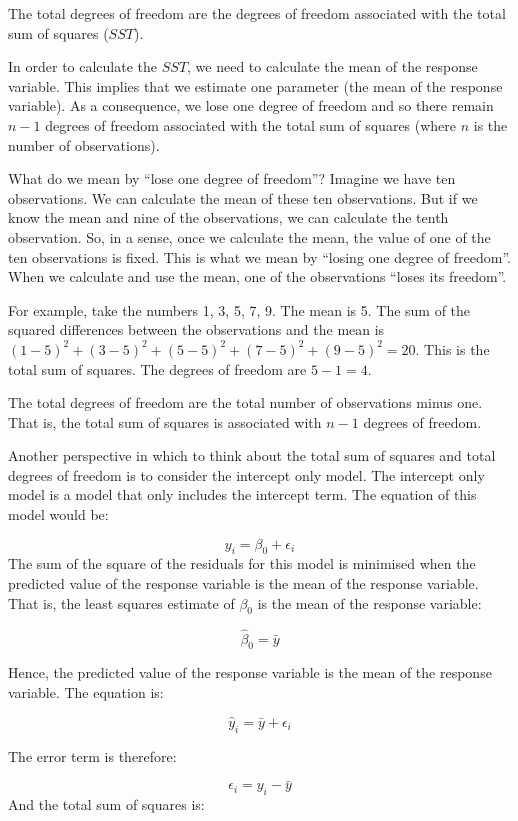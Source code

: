 \documentclass[
  letterpaper,
  8pt,
  a4paper]{book}
\begin{document}
The total degrees of freedom are the degrees of freedom associated with
the total sum of squares (\(SST\)).

In order to calculate the \(SST\), we need to calculate the mean of the
response variable. This implies that we estimate one parameter (the mean
of the response variable). As a consequence, we lose one degree of
freedom and so there remain \(n-1\) degrees of freedom associated with
the total sum of squares (where \(n\) is the number of observations).

What do we mean by ``lose one degree of freedom''? Imagine we have ten
observations. We can calculate the mean of these ten observations. But
if we know the mean and nine of the observations, we can calculate the
tenth observation. So, in a sense, once we calculate the mean, the value
of one of the ten observations is fixed. This is what we mean by
``losing one degree of freedom''. When we calculate and use the mean,
one of the observations ``loses its freedom''.

For example, take the numbers 1, 3, 5, 7, 9. The mean is 5. The sum of
the squared differences between the observations and the mean is
\((1-5)^2 + (3-5)^2 + (5-5)^2 + (7-5)^2 + (9-5)^2 = 20\). This is the
total sum of squares. The degrees of freedom are \(5-1 = 4\).

The total degrees of freedom are the total number of observations minus
one. That is, the total sum of squares is associated with \(n-1\)
degrees of freedom.

Another perspective in which to think about the total sum of squares and
total degrees of freedom is to consider the intercept only model. The
intercept only model is a model that only includes the intercept term.
The equation of this model would be:

\[y_i = \beta_0 + \epsilon_i\] The sum of the square of the residuals
for this model is minimised when the predicted value of the response
variable is the mean of the response variable. That is, the least
squares estimate of \(\beta_0\) is the mean of the response variable:

\[\hat{\beta}_0 = \bar{y}\]

Hence, the predicted value of the response variable is the mean of the
response variable. The equation is:

\[\hat{y}_i = \bar{y} + \epsilon_i\]

The error term is therefore:

\[\epsilon_i = y_i - \bar{y}\] And the total sum of squares is:
\end{document}
